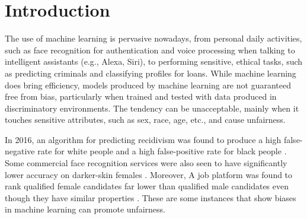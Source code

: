 \documentclass[sigconf,review]{acmart}
\begin{document}
	
	
	\maketitle
	
	\section{Introduction}
	\label{sec:introduction}
	The use of machine learning is pervasive nowadays, from personal daily activities, such as face recognition for authentication and voice processing when talking to intelligent assistants (e.g., Alexa, Siri), to performing sensitive, ethical tasks, such as predicting criminals and classifying profiles for loans. While machine learning does bring efficiency, models produced by machine learning are not guaranteed free from bias, particularly when trained and tested with data produced in discriminatory environments. The tendency can be unacceptable, mainly when it touches sensitive attributes, such as sex, race, age, etc., and cause unfairness. 
	
	In 2016, an algorithm for predicting recidivism was found to produce a high false-negative rate for white people and a high false-positive rate for black people \cite{angwin2016machine}. Some commercial face recognition services were also seen to have significantly lower accuracy on darker-skin females \cite{buolamwini2018gender}. Moreover, A job platform was found to rank qualified female candidates far lower than qualified male candidates even though they have similar properties \cite{lahoti2019ifair}. These are some instances that show biases in machine learning can promote unfairness. 
	
\end{document}
